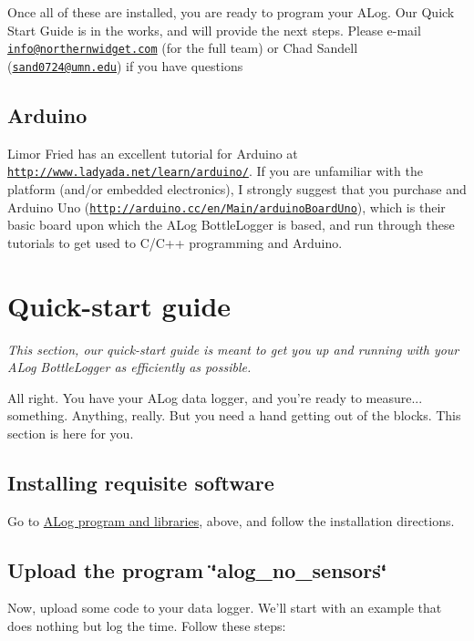 Once all of these are installed, you are ready to program your A\+Log. Our Quick Start Guide is in the works, and will provide the next steps. Please e-\/mail \href{mailto:info@northernwidget.com}{\tt info@northernwidget.\+com} (for the full team) or Chad Sandell (\href{mailto:sand0724@umn.edu}{\tt sand0724@umn.\+edu}) if you have questions\hypertarget{index_arduino_tutorial}{}\subsection{Arduino}\label{index_arduino_tutorial}
Limor Fried has an excellent tutorial for Arduino at \href{http://www.ladyada.net/learn/arduino/}{\tt http\+://www.\+ladyada.\+net/learn/arduino/}. If you are unfamiliar with the platform (and/or embedded electronics), I strongly suggest that you purchase and Arduino Uno (\href{http://arduino.cc/en/Main/arduinoBoardUno}{\tt http\+://arduino.\+cc/en/\+Main/arduino\+Board\+Uno}), which is their basic board upon which the A\+Log Bottle\+Logger is based, and run through these tutorials to get used to C/\+C++ programming and Arduino.\hypertarget{index_quickstart}{}\section{Quick-\/start guide}\label{index_quickstart}
{\itshape This section, our quick-\/start guide is meant to get you up and running with your A\+Log Bottle\+Logger as efficiently as possible.}

All right. You have your A\+Log data logger, and you’re ready to measure... something. Anything, really. But you need a hand getting out of the blocks. This section is here for you.\hypertarget{index_software_install}{}\subsection{Installing requisite software}\label{index_software_install}
Go to \hyperlink{index_libraries}{A\+Log program and libraries}, above, and follow the installation directions.\hypertarget{index_program_upload}{}\subsection{Upload the program \char`\"{}alog\+\_\+no\+\_\+sensors\char`\"{}}\label{index_program_upload}
Now, upload some code to your data logger. We’ll start with an example that does nothing but log the time. Follow these steps\+:


